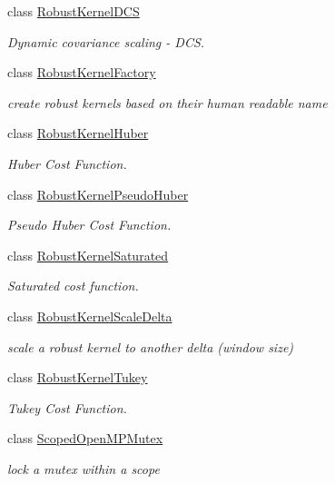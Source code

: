 \begin{DoxyCompactItemize}
class \mbox{\hyperlink{classg2o_1_1_robust_kernel_d_c_s}{Robust\+Kernel\+D\+CS}}
\begin{DoxyCompactList}\small\item\em Dynamic covariance scaling -\/ D\+CS. \end{DoxyCompactList}\item 
class \mbox{\hyperlink{classg2o_1_1_robust_kernel_factory}{Robust\+Kernel\+Factory}}
\begin{DoxyCompactList}\small\item\em create robust kernels based on their human readable name \end{DoxyCompactList}\item 
class \mbox{\hyperlink{classg2o_1_1_robust_kernel_huber}{Robust\+Kernel\+Huber}}
\begin{DoxyCompactList}\small\item\em Huber Cost Function. \end{DoxyCompactList}\item 
class \mbox{\hyperlink{classg2o_1_1_robust_kernel_pseudo_huber}{Robust\+Kernel\+Pseudo\+Huber}}
\begin{DoxyCompactList}\small\item\em Pseudo Huber Cost Function. \end{DoxyCompactList}\item 
class \mbox{\hyperlink{classg2o_1_1_robust_kernel_saturated}{Robust\+Kernel\+Saturated}}
\begin{DoxyCompactList}\small\item\em Saturated cost function. \end{DoxyCompactList}\item 
class \mbox{\hyperlink{classg2o_1_1_robust_kernel_scale_delta}{Robust\+Kernel\+Scale\+Delta}}
\begin{DoxyCompactList}\small\item\em scale a robust kernel to another delta (window size) \end{DoxyCompactList}\item 
class \mbox{\hyperlink{classg2o_1_1_robust_kernel_tukey}{Robust\+Kernel\+Tukey}}
\begin{DoxyCompactList}\small\item\em Tukey Cost Function. \end{DoxyCompactList}\item 
class \mbox{\hyperlink{classg2o_1_1_scoped_open_m_p_mutex}{Scoped\+Open\+M\+P\+Mutex}}
\begin{DoxyCompactList}\small\item\em lock a mutex within a scope \end{DoxyCompactList}\item 

\end{DoxyCompactItemize}
